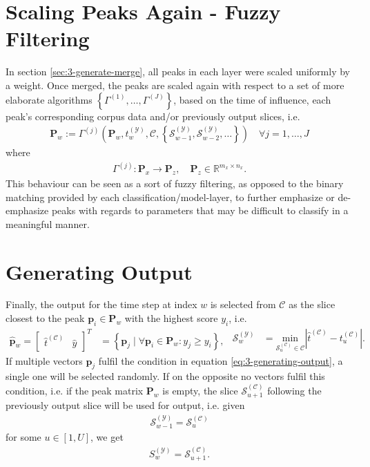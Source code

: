\section{Scaling Peaks Again - Fuzzy Filtering}\label{sec:3-generate-scale}
In section \ref{sec:3-generate-merge}, all peaks in each layer were scaled uniformly by a weight. Once merged, the peaks are scaled again with respect to a set of more elaborate algorithms $\left\lbrace \Gamma^{(1)}, \dots, \Gamma^{(J)}\right\rbrace$, based on the time of influence, each peak's corresponding corpus data and/or previously output slices, i.e.
\begin{align}\label{eq:3-peak-scaling-generic}
	\bm P_w := \Gamma^{(j)}\left(\bm P_w	, t^{(\mathcal Y)}_w, \mathcal C, \left\lbrace \mathcal S^{(\mathcal Y)}_{w-1}, \mathcal S^{(\mathcal Y)}_{w-2},\dots\right\rbrace\right) \quad \forall j = 1,\dots,J
\end{align}
where\begin{align}
	\Gamma^{(j)}\colon \bm P_x \rightarrow \bm P_z, 
	\quad \bm P_z \in \mathbb R^{m_x\times n_x}.
\end{align}
This behaviour can be seen as a sort of fuzzy filtering, as opposed to the binary matching provided by each classification/model-layer, to further emphasize or de-emphasize peaks with regards to parameters that may be difficult to classify in a meaningful manner. 


\section{Generating Output}\label{sec:3-generate-output}
Finally, the output for the time step at index $w$ is selected from $\mathcal C$ as the slice closest to the peak $\bm p_i \in \bm P_w$ with the highest score $y_i$, i.e.
\begin{subequations}
\begin{align}\label{eq:3-generating-output}
	\bm{\hat p}_w = \begin{bmatrix} \hat t^{(\mathcal C)} & \hat y \end{bmatrix}^T &= \left\lbrace \bm p_j \mid \forall \bm p_i \in \bm P_w \colon y_j \ge y_i \right\rbrace,
\end{align}
\begin{align}
	\mathcal S^{(\mathcal Y)}_w &= \underset{\mathcal S^{(\mathcal C)}_u \in \mathcal C}{\text{min}} \left \lvert \hat t^{(\mathcal C)} - t^{(\mathcal C)}_u \right\rvert.
\end{align}
\end{subequations}
If multiple vectors $\bm p_j$ fulfil the condition in equation \ref{eq:3-generating-output}, a single one will be selected randomly. If on the opposite no vectors fulfil this condition, i.e. if the peak matrix $\bm P_w$ is empty, the slice $\mathcal S^{(\mathcal C)}_{u+1}$ following the previously output slice will be used for output, i.e. given 
	\begin{align}
		\mathcal S^{(\mathcal Y)}_{w-1} = \mathcal S^{(\mathcal C)}_u
	\end{align}
	for some $u \in [1, U]$, we get
	\begin{align}\label{eq:3-generating-default-output}
		S^{(\mathcal Y)}_w = \mathcal S^{(\mathcal C)}_{u +1}.
	\end{align}